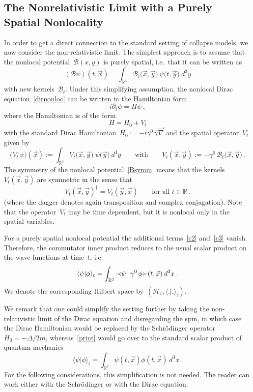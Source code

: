 \documentclass[reqno,11pt]{amsart}
\numberwithin{equation}{section}
\newcommand{\beq}{\begin{equation}}
\newcommand{\eeq}{\end{equation}}
\newcommand{\la}{\langle}
\newcommand{\ra}{\rangle}
\newcommand{\Sl}{\mbox{$\prec \!\!$ \nolinebreak}}
\newcommand{\Sr}{\mbox{\nolinebreak $\succ$}}
\newcommand{\R}{\mathbb{R}}
\newcommand{\1}{\mathds{1}}
\newcommand{\B}{{\mathscr{B}}}
\renewcommand{\H}{\mathscr{H}}
\begin{document}
\subsection{The Nonrelativistic Limit with a Purely Spatial Nonlocality} \label{secpurespatial}
In order to get a direct connection to the standard setting of collapse models,
we now consider the non-relativistic limit.
The simplest approach is to assume that the nonlocal potential~$\B(x,y)$ is purely spatial, i.e.\ that
it can be written as
\beq \label{Bnonrelat}
(\B \psi)(t,\vec{x}) = \int_{\R^3} \B_t \big(\vec{x}, \vec{y} \big) \: \psi \big(t, \vec{y} \big)\: d^3y
\eeq
with new kernels~$\B_t$.
Under this simplifying assumption, the nonlocal Dirac equation~\eqref{dirnonloc} can be written
in the Hamiltonian form
\beq \label{dynHamilton}
i \partial_t \psi = H \psi \:,
\eeq
where the Hamiltonian is of the form
\beq \label{H0V}
H = H_0 + V_t
\eeq
with the standard Dirac Hamiltonian~$H_0 := -i \gamma^0 \vec{\gamma} \vec{\nabla}$ 
and the spatial operator~$V_t$ given by
\beq \label{Vdef}
\big(V_t\, \psi)(\vec{x}) := \int_{\R^3} V_t \big(\vec{x}, \vec{y} \big) \: \psi \big(\vec{y} \big)\: d^3y \qquad \text{with} \qquad
V_t(\vec{x}, \vec{y}) := -\gamma^0 \, \B_t \big( \vec{x}, \vec{y} \big) \:.
\eeq
The symmetry of the nonlocal potential~\eqref{Bsymm} means that the kernels~$V_t(\vec{x}, \vec{y})$
are symmetric in the sense that
\[ V_t(\vec{x}, \vec{y})^\dagger = V_t(\vec{y}, \vec{x}) \qquad \text{for all~$t \in \R$}\:. \]
(where the dagger denotes again transposition and complex conjugation).
Note that the operator~$V_t$ may be time dependent, but it is nonlocal only in the spatial variables.

For a purely spatial nonlocal potential the additional terms~\eqref{c2} and~\eqref{c3} vanish.
Therefore, the commutator inner product reduces to the usual scalar product on the
wave functions at time~$t$, i.e.\
\beq \label{print}
\la \psi |  \phi \ra_t = \int_{\R^3} \Sl \psi \,|\, \gamma^0 \,\phi \Sr(t,\vec{x})\: d^3x \:.
\eeq
We denote the corresponding Hilbert space by~$(\H_t, \la.|.\ra_t)$.

We remark that one could simplify the setting further by taking the non-relativistic limit of the
Dirac equation and disregarding the spin, in which case the Dirac Hamiltonian would be replaced by the Schr\"odinger operator~$H_0=-\Delta/2m$, whereas~\eqref{print} would go over to the standard scalar
product of quantum mechanics
\[ \la \psi |  \phi\ra_t = \int_{\R^3} \overline{\psi(t,\vec{x})} \phi (t,\vec{x})\: d^3x \:. \]
For the following considerations, this simplification is not needed. The reader can work either with
the Schr\"odinger or with the Dirac equation.
\end{document}
